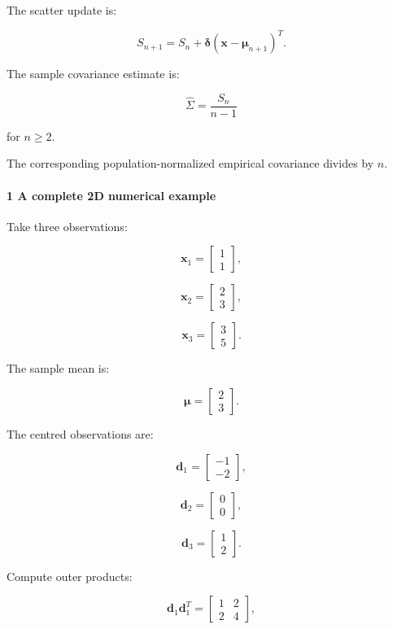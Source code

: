 The scatter update is:

\[
 \boxed{ S_{n+1} = S_n+ \boldsymbol\delta (\mathbf x-\boldsymbol\mu_{n+1})^T }.
\]

The sample covariance estimate is:

\[
 \boxed{ \widehat\Sigma= \frac{S_n}{n-1} }
\]

for \(n\ge2\).

The corresponding population-normalized empirical covariance divides by \(n\).

\paragraph{1 A complete 2D numerical example}\label{a-complete-2d-numerical-example}

Take three observations:

\[
 \mathbf x_1= \begin{bmatrix}1\\1\end{bmatrix},
\]

\[
 \mathbf x_2= \begin{bmatrix}2\\3\end{bmatrix},
\]

\[
 \mathbf x_3= \begin{bmatrix}3\\5\end{bmatrix}.
\]

The sample mean is:

\[
 \boldsymbol\mu= \begin{bmatrix}2\\3\end{bmatrix}.
\]

The centred observations are:

\[
 \mathbf d_1= \begin{bmatrix}-1\\-2\end{bmatrix},
\]

\[
 \mathbf d_2= \begin{bmatrix}0\\0\end{bmatrix},
\]

\[
 \mathbf d_3= \begin{bmatrix}1\\2\end{bmatrix}.
\]

Compute outer products:

\[
 \mathbf d_1\mathbf d_1^T= \begin{bmatrix}1&2\\2&4\end{bmatrix},
\]

